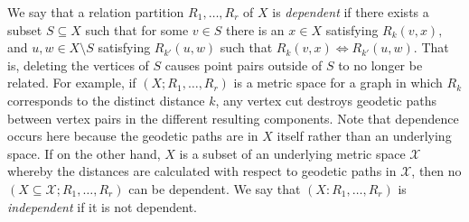 \documentclass[12pt]{article}
\theoremstyle{definition}
\begin{document}
	We say that a relation partition $R_1,\ldots, R_r$ of $X$ is \emph{dependent} if there exists a subset $S \subseteq X$ such that for some $v \in S$ there is an $x \in X$ satisfying $R_k(v,x),$ and $u,w \in X \setminus S$ satisfying $R_{k'}(u,w)$ such that $R_k(v,x) \Leftrightarrow R_{k'}(u,w)$.  That is, deleting the vertices of $S$ causes point pairs outside of $S$ to no longer be related.  For example, if $(X; R_1,\ldots, R_r)$ is a metric space for a graph in which $R_k$ corresponds to the distinct distance $k$, any vertex cut destroys geodetic paths between vertex pairs in the different resulting components.  Note that dependence occurs here because the geodetic paths are in $X$ itself rather than an underlying space.  If on the other hand, $X$ is a subset of an underlying metric space $\mathcal{X}$ whereby the distances are calculated with respect to geodetic paths in $\mathcal{X}$, then no $(X \subseteq \mathcal{X};R_1,\ldots, R_r)$ can be dependent.  We say that $(X: R_1,\ldots, R_r)$ is \emph{independent} if it is not dependent.
	
\end{document}
